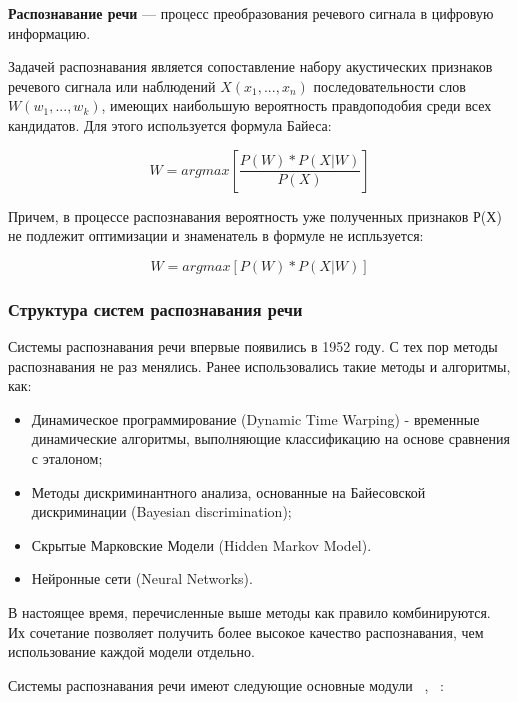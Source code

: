 \documentclass[utf8x, 14pt, oneside, a4paper]{article}
\begin{document}
	{\bf Распознавание речи} — процесс преобразования речевого сигнала в цифровую информацию.
	
	Задачей распознавания является сопоставление набору акустических признаков речевого сигнала или наблюдений $X(x_1,...,x_n)$ последовательности слов $W(w_1,...,w_k)$, имеющих наибольшую вероятность правдоподобия среди всех кандидатов. Для этого используется формула Байеса:
	
	\begin{equation}
		W=argmax\left[\frac{P(W)*P(X|W)}{P(X)}\right]
	\end{equation}

	Причем, в процессе распознавания вероятность уже полученных признаков Р(Х) не подлежит оптимизации и знаменатель в формуле не испльзуется:
	
	\begin{equation}
		W=argmax\left[P(W)*P(X|W)\right]
	\end{equation}
	
	\subsubsection{Структура систем распознавания речи}
	
	Системы распознавания речи впервые появились в 1952 году. С тех пор методы распознавания не раз менялись. Ранее использовались такие методы и алгоритмы, как:
	
	\begin{itemize}
		\item Динамическое программирование (Dynamic Time Warping) - временные динамические алгоритмы, выполняющие классификацию на основе сравнения с эталоном;
		\item Методы дискриминантного анализа, основанные на Байесовской дискриминации (Bayesian discrimination);
		\item Скрытые Марковские Модели (Hidden Markov Model).
		\item Нейронные сети (Neural Networks).
	\end{itemize}

	В настоящее время, перечисленные выше методы как правило комбинируются. Их сочетание позволяет получить более высокое качество распознавания, чем использование каждой модели отдельно.
	
	Системы распознавания речи имеют следующие основные модули ~\cite{speech_classification}, ~\cite{speech_modules}:
	
\end{document}
